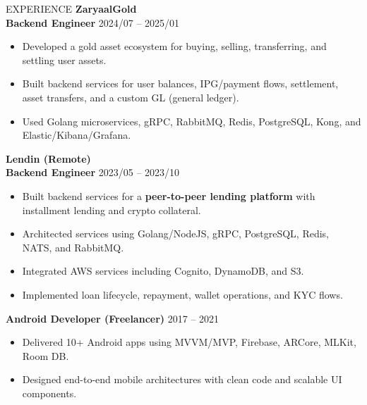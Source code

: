 \documentclass{resume}
\begin{document}
\begin{rSection}{EXPERIENCE}
\textbf{ZaryaalGold} \hfill \\
\textbf{Backend Engineer} \hfill 2024/07 -- 2025/01
\begin{itemize}
    \item Developed a gold asset ecosystem for buying, selling, transferring, and settling user assets.
    \item Built backend services for user balances, IPG/payment flows, settlement, asset transfers, and a custom GL (general ledger).
    \item Used Golang microservices, gRPC, RabbitMQ, Redis, PostgreSQL, Kong, and Elastic/Kibana/Grafana.
\end{itemize}

\textbf{Lendin (Remote)} \hfill \\
\textbf{Backend Engineer} \hfill 2023/05 -- 2023/10
\begin{itemize}
    \item Built backend services for a \textbf{peer-to-peer lending platform} with installment lending and crypto collateral.
    \item Architected services using Golang/NodeJS, gRPC, PostgreSQL, Redis, NATS, and RabbitMQ.
    \item Integrated AWS services including Cognito, DynamoDB, and S3.
    \item Implemented loan lifecycle, repayment, wallet operations, and KYC flows.
\end{itemize}

\textbf{Android Developer (Freelancer)} \hfill 2017 -- 2021
\begin{itemize}
    \item Delivered 10+ Android apps using MVVM/MVP, Firebase, ARCore, MLKit, Room DB.
    \item Designed end-to-end mobile architectures with clean code and scalable UI components.
\end{itemize}

\end{rSection}
\end{document}

